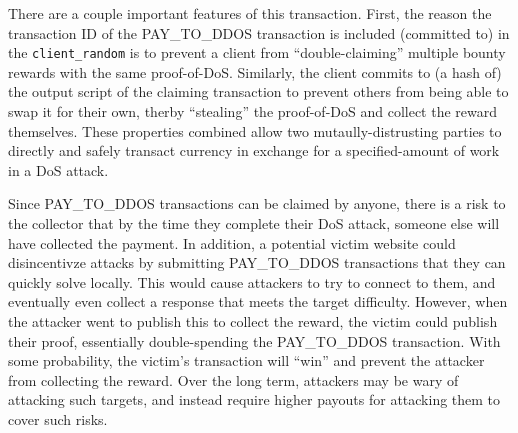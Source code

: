 There are a couple important features of this transaction. First, the reason the
transaction ID of the PAY\_TO\_DDOS transaction is included (committed to) in
the \texttt{client\_random} is to prevent a client from ``double-claiming''
multiple bounty rewards with the same proof-of-DoS. Similarly, the client
commits to (a hash of) the output script of the claiming transaction to
prevent others from being able to swap it for their own, therby ``stealing'' the
proof-of-DoS and collect the reward themselves. These properties combined allow two
mutaully-distrusting parties to directly and safely transact currency in
exchange for a specified-amount of work in a DoS attack.


Since PAY\_TO\_DDOS transactions can be claimed by anyone, there is a risk to
the collector that by the time they complete their DoS attack, someone else will
have collected the payment. In addition, a potential victim website could
disincentivze attacks by submitting PAY\_TO\_DDOS transactions that they can
quickly solve locally. This would cause attackers to try to connect to them, and
eventually even collect a response that meets the target difficulty. However,
when the attacker went to publish this to collect the reward, the victim could
publish their proof, essentially double-spending the PAY\_TO\_DDOS transaction.
With some probability, the victim's transaction will ``win'' and prevent the
attacker from collecting the reward. Over the long term, attackers may be wary
of attacking such targets, and instead require higher payouts for attacking them
to cover such risks.




%

